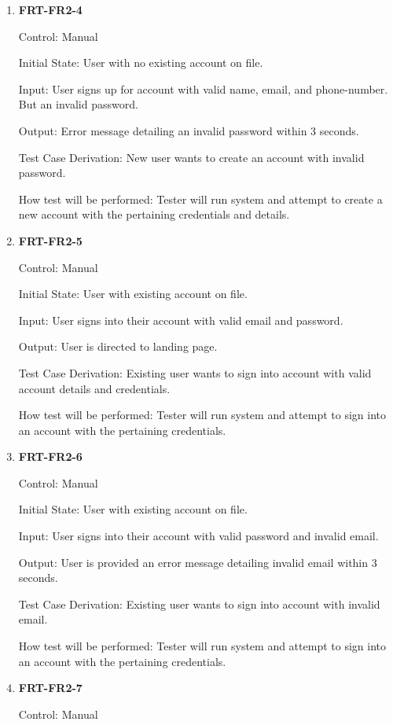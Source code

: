 \documentclass[12pt, titlepage]{article}
\begin{document}
\begin{enumerate}
\item{\textbf{FRT-FR2-4}}

Control: Manual
          
Initial State: User with no existing account on file.
          
Input: User signs up for account with valid name, email, and phone-number. But an invalid password.
          
Output: Error message detailing an invalid password within 3 seconds.

Test Case Derivation: New user wants to create an account with invalid password.

How test will be performed: Tester will run system and attempt to create a new account with the pertaining credentials and details. 

\item{\textbf{FRT-FR2-5}}

Control: Manual
          
Initial State: User with existing account on file.
          
Input: User signs into their account with valid email and password.
          
Output: User is directed to landing page.

Test Case Derivation: Existing user wants to sign into account with valid account details and credentials.
          
How test will be performed: Tester will run system and attempt to sign into an account with the pertaining credentials.
          
\item{\textbf{FRT-FR2-6}}

Control: Manual
          
Initial State: User with existing account on file.
          
Input: User signs into their account with valid password and invalid email.
          
Output: User is provided an error message detailing invalid email within 3 seconds.

Test Case Derivation: Existing user wants to sign into account with invalid email.
          
How test will be performed: Tester will run system and attempt to sign into an account with the pertaining credentials.

\item{\textbf{FRT-FR2-7}}

Control: Manual
          

\end{enumerate}
\end{document}

